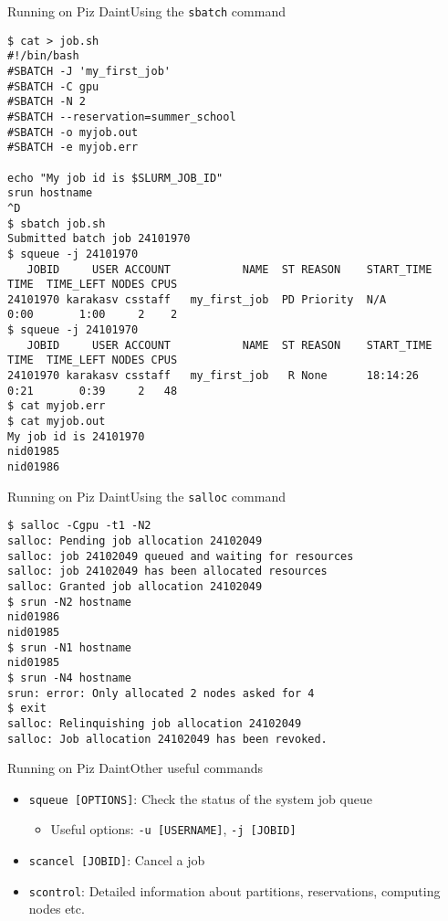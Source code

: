 \begin{frame}[fragile]{Running on Piz Daint}{Using the \texttt{sbatch} command}
  \begin{lstlisting}[style=console]
$ cat > job.sh
#!/bin/bash
#SBATCH -J 'my_first_job'
#SBATCH -C gpu
#SBATCH -N 2
#SBATCH --reservation=summer_school
#SBATCH -o myjob.out
#SBATCH -e myjob.err

echo "My job id is $SLURM_JOB_ID"
srun hostname
^D
$ sbatch job.sh
Submitted batch job 24101970
$ squeue -j 24101970
   JOBID     USER ACCOUNT           NAME  ST REASON    START_TIME           TIME  TIME_LEFT NODES CPUS
24101970 karakasv csstaff   my_first_job  PD Priority  N/A                  0:00       1:00     2    2
$ squeue -j 24101970
   JOBID     USER ACCOUNT           NAME  ST REASON    START_TIME           TIME  TIME_LEFT NODES CPUS
24101970 karakasv csstaff   my_first_job   R None      18:14:26             0:21       0:39     2   48
$ cat myjob.err
$ cat myjob.out
My job id is 24101970
nid01985
nid01986
  \end{lstlisting}
\end{frame}


\begin{frame}[fragile]{Running on Piz Daint}{Using the \texttt{salloc} command}
  \begin{lstlisting}[style=console]
$ salloc -Cgpu -t1 -N2
salloc: Pending job allocation 24102049
salloc: job 24102049 queued and waiting for resources
salloc: job 24102049 has been allocated resources
salloc: Granted job allocation 24102049
$ srun -N2 hostname
nid01986
nid01985
$ srun -N1 hostname
nid01985
$ srun -N4 hostname
srun: error: Only allocated 2 nodes asked for 4
$ exit
salloc: Relinquishing job allocation 24102049
salloc: Job allocation 24102049 has been revoked.
  \end{lstlisting}
\end{frame}

\begin{frame}{Running on Piz Daint}{Other useful commands}
  \begin{itemize}
  \item \texttt{squeue [OPTIONS]}: Check the status of the system job queue
    \begin{itemize}
    \item Useful options: \texttt{-u [USERNAME]}, \texttt{-j [JOBID]}
    \end{itemize}
  \item \texttt{scancel [JOBID]}: Cancel a job
  \item \texttt{scontrol}: Detailed information about partitions, reservations,
    computing nodes etc.
  \end{itemize}
\end{frame}

